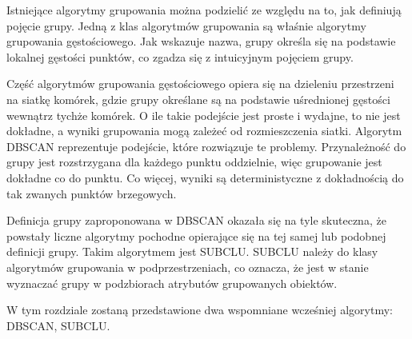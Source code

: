 Istniejące algorytmy grupowania można podzielić ze względu na to, jak definiują pojęcie grupy. Jedną z klas algorytmów grupowania są właśnie algorytmy grupowania gęstościowego. Jak wskazuje nazwa, grupy określa się na podstawie lokalnej gęstości punktów, co zgadza się z intuicyjnym pojęciem grupy.\par

Część algorytmów grupowania gęstościowego opiera się na dzieleniu przestrzeni na siatkę komórek, gdzie grupy określane są na podstawie uśrednionej gęstości wewnątrz tychże komórek. O ile takie podejście jest proste i wydajne, to nie jest dokładne, a wyniki grupowania mogą zależeć od rozmieszczenia siatki. Algorytm DBSCAN reprezentuje podejście, które rozwiązuje te problemy. Przynależność do grupy jest rozstrzygana dla każdego punktu oddzielnie, więc grupowanie jest dokładne co do punktu. Co więcej, wyniki są deterministyczne z dokładnością do tak zwanych punktów brzegowych.\par
Definicja grupy zaproponowana w DBSCAN okazała się na tyle skuteczna, że powstały liczne algorytmy pochodne opierające się na tej samej lub podobnej definicji grupy. Takim algorytmem jest SUBCLU. SUBCLU należy do klasy algorytmów grupowania w podprzestrzeniach, co oznacza, że jest w stanie wyznaczać grupy w podzbiorach atrybutów grupowanych obiektów.\par
W tym rozdziale zostaną przedstawione dwa wspomniane wcześniej algorytmy: DBSCAN, SUBCLU.